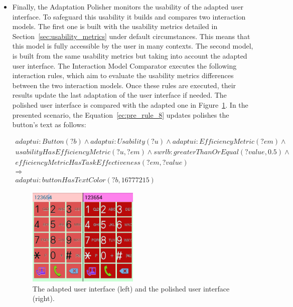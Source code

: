 \begin{itemize}
\begin{itemize}
    \item Finally, the Adaptation Polisher monitors the usability of the adapted
    user interface. To safeguard this usability it builds and compares two
    interaction models. The first one is built with the usability metrics detailed
    in Section~\ref{sec:usability_metrics} under default circumstances. This means
    that this model is fully accessible by the user in many contexts. The second 
    model, is built from the same usability metrics but taking into account the 
    adapted user interface. The Interaction Model Comparator executes the following
    interaction rules, which aim to evaluate the usability metrics differences
    between the two interaction models. Once these rules are executed, their
    results update the last adaptation of the user interface if needed. The
    polished user interface is compared with the adapted one in 
    Figure~\ref{fig:example_scenario_adapted_vs_polished}. In the presented
    scenario, the Equation~\ref{ec:pre_rule_8} updates polishes the button's
    text as follows: 

    \footnotesize
    \begin{equation} \label{ec:pre_rule_8} 
    \begin{align*} 
    adaptui:Button (?b) ∧ adaptui:Usability (?u) ∧ adaptui:EfficiencyMetric (?em) ∧ \\
    usabilityHasEfficiencyMetric (?u, ?em) ∧ swrlb:greaterThanOrEqual (?value, 0.5) ∧ \\
    efficiencyMetricHasTaskEffectiveness (?em, ?value)\\
    \Rightarrow \\
    adaptui:buttonHasTextColor (?b, 16777215)
    \end{align*}
    \end{equation}
    \normalsize

    \begin{figure}
    \centering
    \includegraphics[width=0.50\textwidth]{example_scenario_adapted_vs_polished.png}
    \caption{The adapted user interface (left) and the polished user interface (right).}
    \label{fig:example_scenario_adapted_vs_polished}
    \end{figure}

  \end{itemize}

\end{itemize}

